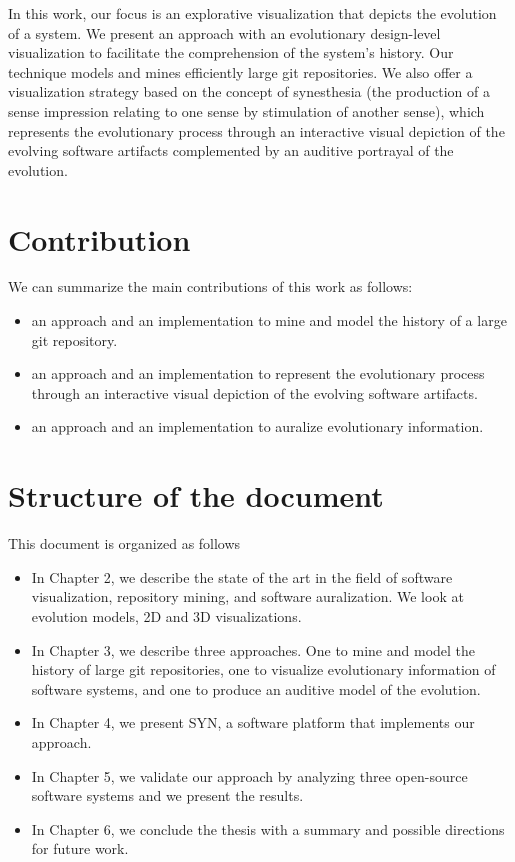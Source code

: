 In this work, our focus is an explorative visualization that depicts the evolution of a system.
We present an approach with an evolutionary design-level visualization to facilitate the comprehension of the system's history. 
Our technique models and mines efficiently large git repositories. We also offer a visualization strategy based on the concept of synesthesia 
(the production of a sense impression relating to one sense by stimulation of another sense), 
which represents the evolutionary process through an interactive visual depiction of the evolving software artifacts complemented by an auditive portrayal of the evolution. 

\section{Contribution}
We can summarize the main contributions of this work as follows:
\begin{itemize}
 \item an approach and an implementation to mine and model the history of a large git repository.
 \item an approach and an implementation to represent the evolutionary process through an interactive visual depiction of the evolving software artifacts.
 \item an approach and an implementation to auralize evolutionary information. 
\end{itemize}

\section{Structure of the document}
This document is organized as follows
\begin{itemize}
 \item In Chapter 2, we describe the state of the art in the field of software visualization, repository mining, and software auralization. We look at evolution models, 2D and 3D visualizations. 
 \item In Chapter 3, we describe three approaches. One to mine and model the history of large git repositories, one to visualize evolutionary information of software systems, and one to produce an auditive model of the evolution. 
 \item In Chapter 4, we present SYN, a software platform that implements our approach. 
 \item In Chapter 5, we validate our approach by analyzing three open-source software systems and we present the results. 
 \item In Chapter 6, we conclude the thesis with a summary and possible directions for future work.
 \end{itemize}